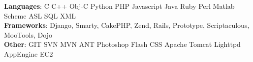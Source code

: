 \documentclass[margin,line]{resume}
\begin{document}
\begin{resume}
    \textbf{Languages}: C C++ Obj-C Python PHP Javascript Java Ruby Perl Matlab Scheme ASL SQL XML\\
    \textbf{Frameworks}: Django, Smarty, CakePHP, Zend, Rails, Prototype, Scriptaculous, MooTools, Dojo \\
    \textbf{Other}: GIT SVN MVN ANT Photoshop Flash CSS Apache Tomcat Lighttpd AppEngine EC2 \\

%
%
%
%

\end{resume}
\end{document}
